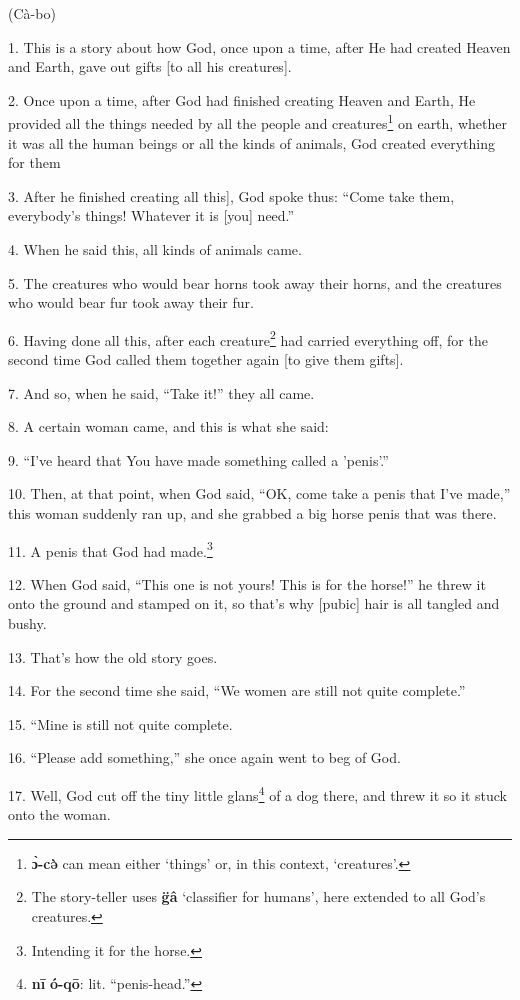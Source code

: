 \setcounter{footnote}{0}

(Cà-bo)

1. This is a story about how God, once upon a time, after He had created Heaven
and Earth, gave out gifts [to all his creatures].

2. Once upon a time, after God had finished creating Heaven and Earth, He provided
all the things needed by all the people and creatures\footnote{\textbf{ɔ̀-cə̀} can mean either `things' or, in this context, `creatures'.} on earth, whether it was
all the human beings or all the kinds of animals, God created everything for them

3. After he finished creating all this], God spoke thus: ``Come take them, everybody's
things! Whatever it is [you] need.''

4. When he said this, all kinds of animals came.

5. The creatures who would bear horns took away their horns, and the creatures
who would bear fur took away their fur.

6. Having done all this, after each creature\footnote{The story-teller uses \textbf{g̈â} `classifier for humans', here extended to all God's creatures.} had carried everything off, for
the second time God called them together again [to give them gifts].

7. And so, when he said, ``Take it!'' they all came.

8. A certain woman came, and this is what she said:

9. ``I've heard that You have made something called a 'penis'.''

10. Then, at that point, when God said, ``OK, come take a penis that I've made,''
this woman suddenly ran up, and she grabbed a big horse penis that was there.

11. A penis that God had made.\footnote{Intending it for the horse.}

12. When God said, ``This one is not yours! This is for the horse!'' he threw it
onto the ground and stamped on it, so that's why [pubic] hair is all tangled and
bushy.

13. That's how the old story goes.

14. For the second time she said, ``We women are still not quite complete.''

15. ``Mine is still not quite complete.

16. ``Please add something,'' she once again went to beg of God.

17. Well, God cut off the tiny little glans\footnote{\textbf{nī} \textbf{ó-qō}: lit. ``penis-head.''} of a dog there, and threw it so
it stuck onto the woman.

